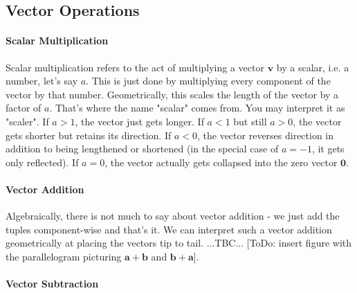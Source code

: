 
\subsection{Vector Operations}

\paragraph{Scalar Multiplication}
Scalar multiplication refers to the act of multiplying a vector $\mathbf{v}$ by a scalar, i.e. a number, let's say $a$. This is just done by multiplying every component of the vector by that number. Geometrically, this scales the length of the vector by a factor of $a$. That's where the name "scalar" comes from. You may interpret it as "scaler". If $a > 1$, the vector just gets longer. If $a < 1$ but still $a > 0$, the vector gets shorter but retains its direction. If $a < 0$, the vector reverses direction in addition to being lengthened or shortened (in the special case of $a=-1$, it gets only reflected). If $a = 0$, the vector actually gets collapsed into the zero vector $\mathbf{0}$.

\paragraph{Vector Addition}
Algebraically, there is not much to say about vector addition - we just add the tuples component-wise and that's it. We can interpret such a vector addition geometrically at placing the vectors tip to tail. ...TBC... [ToDo: insert figure with the parallelogram picturing $\mathbf{a + b}$ and $\mathbf{b + a}$].

% 

\paragraph{Vector Subtraction}

